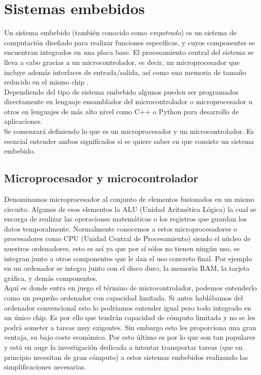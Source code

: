 \section{Sistemas embebidos}
Un sistema embebido (también conocido como \textit{empotrado}) es un sistema de computación diseñado para realizar funciones específicas, y cuyos componentes se encuentran integrados en una placa base. El procesamiento central del sistema se lleva a cabo gracias a un microcontrolador, es decir, un microprocesador que incluye además interfaces de entrada/salida, así como una memoria de tamaño reducido en el mismo chip \cite{sistemas_empotrados}.\\

Dependiendo del tipo de sistema embebido algunos pueden ser programados directamente en lenguaje ensamblador del microcontrolador o microprocesador u otros en lenguajes de más alto nivel como C++ o Python para desarrollo de aplicaciones.\\

Se comenzará definiendo lo que es un microprocesador y un microcontrolador. Es esencial entender ambos significados si se quiere saber en que consiste un sistema embebido.

\subsection{Microprocesador y microcontrolador}

Denominamos microprocesador al conjunto de elementos fusionados en un mismo circuito. Algunos de esos elementos la ALU (Unidad Aritmética Lógica) la cual se encarga de realizar las operaciones matemáticas o los registros que guardan los datos temporalmente. Normalmente conocemos a estos microprocesadores o procesadores como CPU (Unidad Central de Procesamiento) siendo el núcleo de nuestros ordenadores, esto es así ya que por sí sólos no tienen ningún uso, se integran junto a otros componentes que le dan el uso concreto final. Por ejemplo en un ordenador se integra junto con el disco duro, la memoria RAM, la tarjeta gráfica, y demás componentes.\\

Aquí es donde entra en juego el término de microcontrolador, podemos entenderlo como un pequeño ordenador con capacidad limitada. Si antes hablábamos del ordenador convencional esto lo podríamos entender igual pero todo integrado en un único chip. Es por ello que tendrán capacidad de cómputo limitada y no se les podrá someter a tareas muy exigentes. Sin embargo esto les proporciona una gran ventaja, su bajo coste económico. Por esto último es por lo que son tan populares y está en auge la investigación dedicada a intentar transportar tareas (que en principio necesitan de gran cómputo) a estos sistemas embebidos realizando las simplificaciones necesarias.

